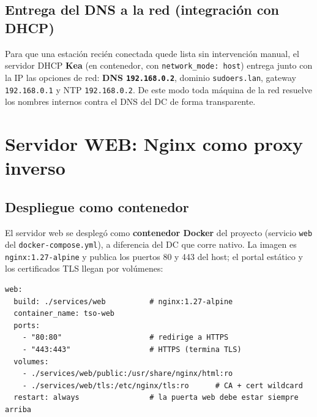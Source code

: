 \subsection{Entrega del DNS a la red (integraci\'on con DHCP)}

Para que una estaci\'on reci\'en conectada quede lista sin intervenci\'on
manual, el servidor DHCP \textbf{Kea} (en contenedor, con \texttt{network\_mode:
host}) entrega junto con la IP las opciones de red: \textbf{DNS
\texttt{192.168.0.2}}, dominio \texttt{sudoers.lan}, gateway
\texttt{192.168.0.1} y NTP \texttt{192.168.0.2}. De este modo toda m\'aquina
de la red resuelve los nombres internos contra el DNS del DC de forma
transparente.

\section{Servidor WEB: Nginx como proxy inverso}

\subsection{Despliegue como contenedor}

El servidor web se despleg\'o como \textbf{contenedor Docker} del proyecto
(servicio \texttt{web} del \texttt{docker-compose.yml}), a diferencia del DC
que corre nativo. La imagen es \texttt{nginx:1.27-alpine} y publica los
puertos 80 y 443 del host; el portal est\'atico y los certificados TLS llegan
por vol\'umenes:

\begin{lstlisting}[style=terminal]
web:
  build: ./services/web          # nginx:1.27-alpine
  container_name: tso-web
  ports:
    - "80:80"                    # redirige a HTTPS
    - "443:443"                  # HTTPS (termina TLS)
  volumes:
    - ./services/web/public:/usr/share/nginx/html:ro
    - ./services/web/tls:/etc/nginx/tls:ro      # CA + cert wildcard
  restart: always                # la puerta web debe estar siempre arriba
\end{lstlisting}


